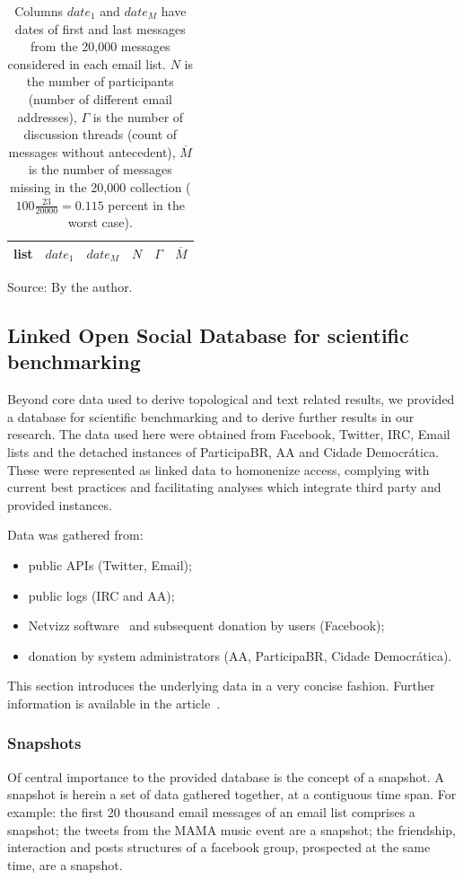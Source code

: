 \begin{table}
\centering
\caption{Columns $date_1$ and $date_M$ have dates of first and last messages from the 20,000 messages considered in each email list.
$N$ is the number of participants (number of different email addresses),
$\Gamma$ is the number of discussion threads (count of messages without antecedent),
$\overline{M}$ is the number of messages missing in the 20,000 collection
($100\frac{23}{20000}=0.115$ percent in the worst case).
}
\label{tab:genLists}
\begin{tabular}{|l|c|c|c|c|c|}\hline
list & $date_1$ & $date_{M}$ & $N$ & $\Gamma$ & $\overline{M}$ \\\hline

\end{tabular}
\begin{flushleft}\footnotesize
Source: By the author.\
\end{flushleft}
\end{table} 

\subsection{Linked Open Social Database for scientific benchmarking}
Beyond core data used to derive topological and text related results,
we provided a database for scientific benchmarking and to derive further results in our research.
The data used here were obtained from Facebook, Twitter, IRC, Email lists and the
detached instances of ParticipaBR, AA and Cidade Democr\'atica.
These were represented as linked data to homonenize access,
complying with current best practices and facilitating analyses which integrate third
party and provided instances. 

Data was gathered from:
\begin{itemize}
\item public APIs (Twitter, Email);
\item public logs (IRC and AA);
\item Netvizz software~\cite{netvizz} and subsequent donation by users (Facebook);
\item donation by system administrators (AA, ParticipaBR, Cidade Democr\'atica).
\end{itemize}

This section introduces the underlying data in a very concise fashion.
Further information is available in the article~\cite{losd}.

\subsubsection{Snapshots}
Of central importance to the provided database is the concept of a snapshot.
A snapshot is herein a set of data gathered together,
at a contiguous time span.
For example: the first 20 thousand email messages of an email list
comprises a snapshot; the tweets from the MAMA music event are a
snapshot; the friendship, interaction and posts structures of a facebook
group, prospected at the same time, are a snapshot.

